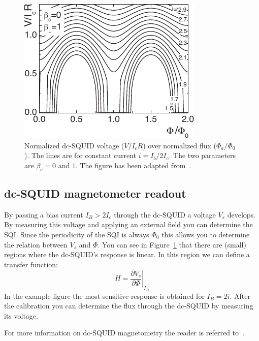\begin{figure}[ht!]
	\centering
	\includegraphics{figures/example_SQI.pdf}
	\caption{Normalized dc-SQUID voltage ($V/I_cR$) over normalized flux ($\Phi_a/\Phi_0$). The lines are for constant current $i=I_b/2I_c$. The two parameters are $\beta_c = 0$ and $1$. The figure has been adapted from~\cite{clarkeSQUIDHandbook2004}.}
	\label{fig:example-SQI}
\end{figure}

\subsection{dc-SQUID magnetometer readout}
By passing a bias current $I_B > 2I_c$ through the dc-SQUID a voltage $V_s$ develops. By measuring this voltage and applying an external field you can determine the SQI. Since the periodicity of the SQI is always $\Phi_0$ this allows you to determine the relation between $V_s$ and $\Phi$. You can see in Figure~\ref{fig:example-SQI} that there are (small) regions where the dc-SQUID's response is linear. In this region we can define a transfer function\cite{rogSQUIDontipMagneticMicroscopy2022}:
\begin{equation}
	H = \left. \frac{\partial V_s}{\partial \Phi} \right|_{I_B}
\end{equation}
In the example figure the most sensitive response is obtained for $I_B = 2i$. After the calibration you can determine the flux through the dc-SQUID by measuring its voltage.

For more information on dc-SQUID magnetometry the reader is referred to~\cite{tinkhamIntroductionSuperconductivity,clarkeSQUIDHandbook2004,schmelzSuperconductingQuantumInterference2017}.